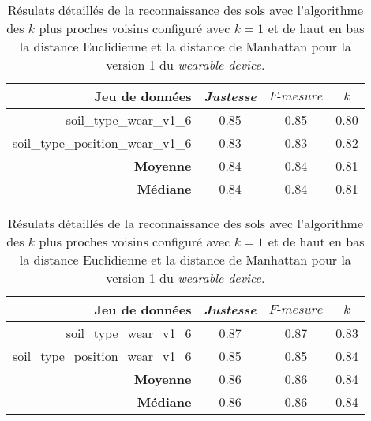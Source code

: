 \begin{table}[H]\renewcommand{\arraystretch}{0.5}
	\centering
	\caption{Résulats détaillés de la reconnaissance des sols avec l'algorithme des $k$ plus proches voisins configuré avec $k=1$ et de haut en bas la distance Euclidienne et la distance de Manhattan pour la version 1 du \textit{wearable device}.}
	\label{tab:knn-wear-v1}
	\begin{tabular}{@{}rccc@{}}
		\toprule
			\textbf{Jeu de données} & \textit{Justesse} & $F\mbox{-} mesure$ & \textbf{$k$} \\
		\midrule
			soil\_type\_wear\_v1\_6 & 0.85 & 0.85 & 0.80 \\
			soil\_type\_position\_wear\_v1\_6 & 0.83 & 0.83 & 0.82 \\
			\textbf{Moyenne} & 0.84 & 0.84 & 0.81 \\
			\textbf{Médiane} & 0.84 & 0.84 & 0.81 \\
	\end{tabular}
	\begin{tabular}{@{}rccc@{}}
		\toprule
			\textbf{Jeu de données} & \textit{Justesse} & $F\mbox{-} mesure$ & \textbf{$k$} \\
		\midrule
			soil\_type\_wear\_v1\_6 & 0.87 & 0.87 & 0.83 \\
			soil\_type\_position\_wear\_v1\_6 & 0.85 & 0.85 & 0.84 \\
			\textbf{Moyenne} & 0.86 & 0.86 & 0.84 \\
			\textbf{Médiane} & 0.86 & 0.86 & 0.84 \\
		\bottomrule
	\end{tabular}
\end{table}

